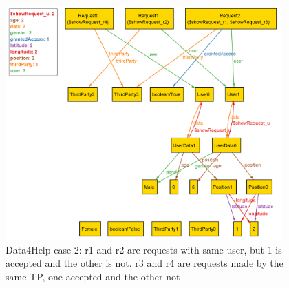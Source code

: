 \begin{figure}[H]
\includegraphics[width=\linewidth, height = 9cm, keepaspectratio]{./Images/Alloy/data4help_2.png}
\centering
\caption{Data4Help case 2: r1 and r2 are requests with same user, but 1 is accepted and the other is not. r3 and r4 are requests made by the same TP, one accepted and the other not}
\end{figure}

